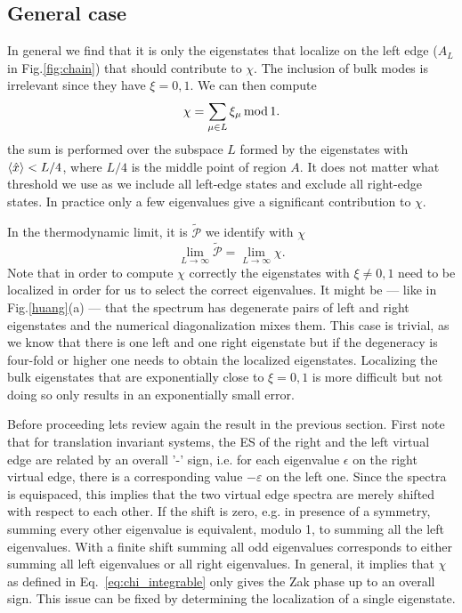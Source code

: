 \documentclass[twocolumn,amsmath,longbibliography,amssymb,superscriptaddress]{revtex4-1}
\begin{document}
\subsection{General case}

In general we find that it is only the eigenstates that localize on the left edge ($A_L$ in Fig.\ref{fig:chain}) that should contribute to $\chi$. The inclusion of bulk modes is irrelevant since they have $\xi = 0,1$. We can then compute
\begin{equation}
\chi = \sum_{\mu \in L} \xi_\mu \, {\rm mod} \, 1. 
\label{eq:chi_left}
\end{equation}
the sum is performed over the subspace $L$ formed by the eigenstates with $\expval{\hat{x}}<L/4$, where $L/4$ is the middle point of region $A$. It does not matter what threshold we use as we include all left-edge states and exclude all right-edge states. In practice only a few eigenvalues give a significant contribution to $\chi$. 


In the thermodynamic limit, it is $\tilde{\mathcal{P}}$ we identify with $\chi$
\begin{equation}
\lim_{L \rightarrow \infty} \tilde{\mathcal{P}} = \lim_{L \rightarrow \infty} \chi.
\label{eq:ptilde_eq_chi}
\end{equation}
Note that in order to compute $\chi$ correctly the eigenstates with $\xi \neq 0,1$ need to be localized in order for us to select the correct eigenvalues. It might be --- like in Fig.\ref{huang}(a) --- that the spectrum has degenerate pairs of left and right eigenstates and the numerical diagonalization mixes them. This case is trivial, as we know that there is one left and one right eigenstate but if the degeneracy is four-fold or higher one needs to obtain the localized eigenstates. Localizing the bulk eigenstates that are exponentially close to $\xi = 0,1$ is more difficult but not doing so only results in an exponentially small error. 

Before proceeding lets review again the result in the previous section. First note that for translation invariant systems, the ES of the right and the left virtual edge are related by an overall '-' sign, i.e. for each eigenvalue $\epsilon$ on the right virtual edge, there is a corresponding value $-\varepsilon$ on the left one. 
Since the spectra is equispaced, this implies that the two virtual edge spectra are merely shifted with respect to each other.
If the shift is zero, e.g.  in presence of a symmetry, summing every other eigenvalue is equivalent, modulo 1, to summing all the left eigenvalues. With a finite shift summing all odd eigenvalues corresponds to either summing all left eigenvalues or all right eigenvalues. In general, it implies that $\chi$ as defined in Eq.~\eqref{eq:chi_integrable} only gives the Zak phase up to an overall sign. This issue can be fixed by determining the localization of a single eigenstate. 
\end{document}
